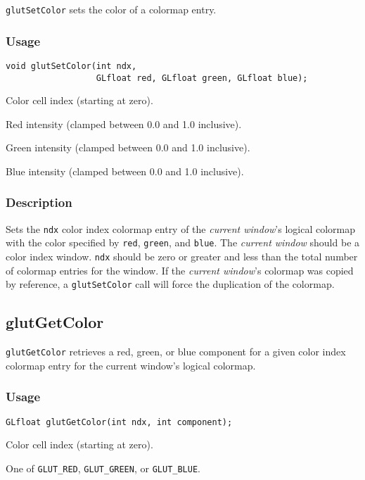 {\tt glutSetColor} sets the color of a colormap entry.

\subsubsection*{Usage}
\begin{verbatim}
void glutSetColor(int ndx,
                  GLfloat red, GLfloat green, GLfloat blue);
\end{verbatim}
\begin{description}
\itemsep 0in
\item[\tt ndx]
Color cell index (starting at zero).
\item[\tt red]
Red intensity (clamped between 0.0 and 1.0 inclusive).
\item[\tt green]
Green intensity (clamped between 0.0 and 1.0 inclusive).
\item[\tt blue]
Blue intensity (clamped between 0.0 and 1.0 inclusive).
\end{description}

\subsubsection*{Description}

Sets the {\tt ndx} color index colormap entry of the {\em current window}'s logical
colormap with the color specified by {\tt red}, {\tt green}, and {\tt blue}.
The {\em current window} should be a color index window.
{\tt ndx} should be zero or greater and less than the total number of colormap entries
for the window.
If the {\em current window}'s colormap was copied by reference,
a {\tt glutSetColor} call will force the duplication of the colormap.

\subsection{glutGetColor}

{\tt glutGetColor} retrieves a red, green, or blue component for a given
color index colormap entry for the current window's logical colormap.

\subsubsection*{Usage}
\begin{verbatim}
GLfloat glutGetColor(int ndx, int component);
\end{verbatim}
\begin{description}
\itemsep 0in
\item[\tt ndx]
Color cell index (starting at zero).
\item[\tt component]
One of {\tt GLUT\_RED}, {\tt GLUT\_GREEN}, or {\tt GLUT\_BLUE}.
\end{description}

